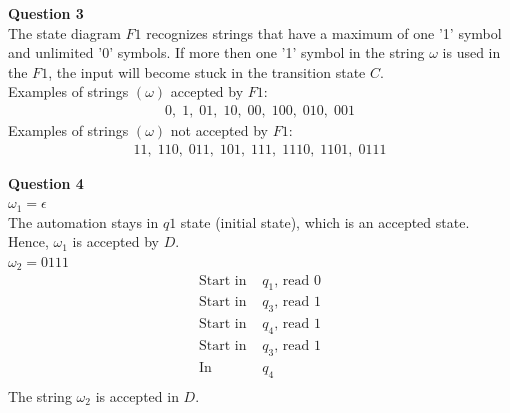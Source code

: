 \documentclass{article}
\begin{document}
\bigskip
{\bf Question 3}\\
The state diagram $F1$ recognizes strings that have a maximum of one '1' symbol and unlimited '0' symbols. If more then one '1' symbol in the string $\omega$ is used in the $F1$, the input will become stuck in the transition state $C$.\\

Examples of strings $(\omega)$ accepted by $F1$:
\begin{equation*}
    \begin{split}
        0, \;1, \;01, \;10, \;00, \;100, \;010, \;001
    \end{split}
\end{equation*}
Examples of strings $(\omega)$ not accepted by $F1$:
\begin{equation*}
    \begin{split}
        11, \;110, \;011, \;101, \;111, \;1110, \;1101, \;0111
    \end{split}
\end{equation*}


{\bf Question 4}\\
$\omega_1=\epsilon$\\
The automation stays in $q1$ state (initial state), which is an accepted state. Hence, $\omega_1$ is accepted by $D$.\\

$\omega_2=0111$\\
\begin{equation*}
    \begin{split}
        \text{Start in } & q_1 \text{, read } 0\\
        \text{Start in } & q_3 \text{, read } 1\\
        \text{Start in } & q_4 \text{, read } 1\\
        \text{Start in } & q_3 \text{, read } 1\\
        \text{In } & q_4\\
    \end{split}
\end{equation*}
The string $\omega_2$ is accepted in $D$.\\
\end{document}
